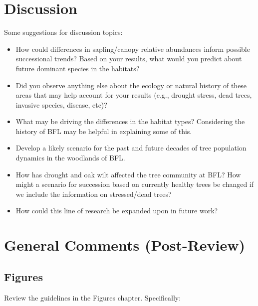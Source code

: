 \documentclass[]{book}
\providecommand{\tightlist}{%
  \setlength{\itemsep}{0pt}\setlength{\parskip}{0pt}}
\begin{document}
\section{Discussion}\label{discussion-1}

Some suggestions for discussion topics:

\begin{itemize}
\tightlist
\item
  How could differences in sapling/canopy relative abundances inform
  possible successional trends? Based on your results, what would you
  predict about future dominant species in the habitats?
\item
  Did you observe anything else about the ecology or natural history of
  these areas that may help account for your results (e.g., drought
  stress, dead trees, invasive species, disease, etc)?
\item
  What may be driving the differences in the habitat types? Considering
  the history of BFL may be helpful in explaining some of this.
\item
  Develop a likely scenario for the past and future decades of tree
  population dynamics in the woodlands of BFL.
\item
  How has drought and oak wilt affected the tree community at BFL? How
  might a scenario for succession based on currently healthy trees be
  changed if we include the information on stressed/dead trees?
\item
  How could this line of research be expanded upon in future work?
\end{itemize}

\section{General Comments
(Post-Review)}\label{general-comments-post-review}

\subsection{Figures}\label{figures-1}

Review the guidelines in the Figures chapter. Specifically:
\end{document}
